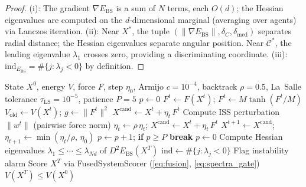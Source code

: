 \documentclass[final]{siamltex}
\newcommand{\norm}[1]{\lVert #1 \rVert}
\providecommand{\grad}{\nabla}
\newcommand{\Ebs}{E_{\mathrm{BS}}}
\newcommand{\Cman}{\mathcal{C}^*}
\newcommand{\Xst}{X^*}
\begin{document}
\begin{proof}
(i): The gradient $\grad\Ebs$ is a sum of $N$ terms, each $O(d)$;
the Hessian eigenvalues are computed on the $d$-dimensional
marginal (averaging over agents) via Lanczos iteration.
(ii): Near $\Xst$, the tuple $(\norm{\grad\Ebs},\delta_C,
\delta_{\mathrm{med}})$ separates radial distance; the Hessian
eigenvalues separate angular position.  Near $\Cman$, the
leading eigenvalue $\lambda_1$ crosses zero, providing a
discriminating coordinate.
(iii): $\mathrm{ind}_{\Ebs} = \#\{j : \lambda_j < 0\}$ by
definition.
\end{proof}

\begin{algorithm}[H]
\caption{Lyapunov v2 Barrier-Augmented Euler Integration
with Decoupled Morse Alarm}
\label{alg:adaptive}
\begin{algorithmic}[1]
\REQUIRE State $X^0$, energy $V$, force $F$, step $\eta_0$,
  Armijo $c = 10^{-4}$, backtrack $\rho = 0.5$,
  La~Salle tolerance $\tau_{\mathrm{LS}} = 10^{-5}$, patience $P = 5$
\STATE $p \leftarrow 0$ 
\STATE {}
  \STATE $F^t \leftarrow F(X^t)$;
    $F^t \leftarrow M\tanh(F^t / M)$ 
  \STATE $V_{\mathrm{old}} \leftarrow V(X^t)$;
    $g \leftarrow \norm{F^t}^2$
  \STATE $X^{\mathrm{cand}} \leftarrow X^t + \eta_t\,F^t$
  \STATE Compute ISS perturbation $\norm{w^t}$ (pairwise force norm)
  \WHILE{$V_{\mathrm{old}} - V(X^{\mathrm{cand}}) <
    c\,\eta_t\,g - \norm{w^t}^2$}
    \STATE $\eta_t \leftarrow \rho\,\eta_t$;
      $X^{\mathrm{cand}} \leftarrow X^t + \eta_t\,F^t$
  \ENDWHILE
  \STATE $X^{t+1} \leftarrow X^{\mathrm{cand}}$;
    $\eta_{t+1} \leftarrow \min(\eta_t / \rho,\, \eta_0)$
    \STATE $p \leftarrow p + 1$;
      \textbf{if} $p \ge P$ \textbf{break} 
  \ELSE
    \STATE $p \leftarrow 0$
  \ENDIF
\ENDFOR
\STATE {}
\STATE Compute Hessian eigenvalues $\lambda_1 \le \cdots \le
  \lambda_{Nd}$ of $D^2\Ebs(X^T)$
\STATE $\mathrm{ind} \leftarrow \#\{j : \lambda_j < 0\}$
  \STATE Flag instability alarm
\ENDIF
\STATE Score $X^T$ via FusedSystemScorer
  (\eqref{eq:fusion}, \eqref{eq:spectra_gate})
\ENSURE $V(X^T) \le V(X^0)$ 
\end{algorithmic}
\end{algorithm}
\end{document}

